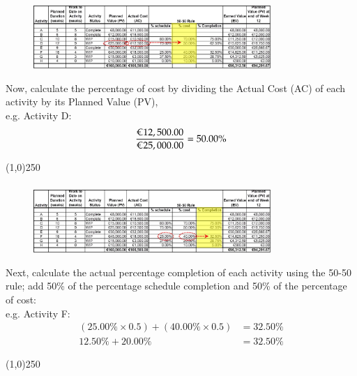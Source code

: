\begin{frame}
\frametitle{}
\begin{figure}
	\centering
		\includegraphics[width = 9cm]{images/evmstep4.jpg}
	\label{fig:evmstep4}
\end{figure}
Now, calculate the percentage of cost by dividing the Actual Cost (AC) of each activity by its Planned Value (PV),\\ e.g. Activity D:
\[
\frac{\text{\euro}12,500.00}{\text{\euro}25,000.00} = 50.00\% 
\] 
\end{frame}
\begin{center}\line(1,0){250}\end{center}






\begin{frame}
\frametitle{}
\begin{figure}
	\centering
		\includegraphics[width = 9cm]{images/evmstep5.jpg}
	\label{fig:evmstep5}
\end{figure}
Next, calculate the actual percentage completion of each activity using the 50-50 rule; add 50\% of the percentage schedule completion and 50\% of the percentage of cost: \\ e.g. Activity F: 
\begin{align*}
(25.00\% \times 0.5) + (40.00\% \times 0.5) &= 32.50\%\\
12.50\% + 20.00\% &= 32.50\%
\end{align*}
\end{frame}
\begin{center}\line(1,0){250}\end{center}






